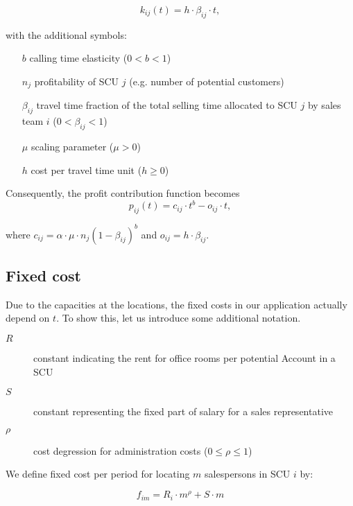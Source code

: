 \documentclass[12pt]{scrartcl}
\begin{document}
\begin{equation}
    k_{ij}(t) = h \cdot \beta_{ij} \cdot t,
\end{equation}

\noindent with the additional symbols:

\begin{itemize}
\setlength{\labelsep}{1em}
    \item[$b$] calling time elasticity ($0<b<1$)
    \item[$n_j$] profitability of SCU $j$ (e.g. number of potential customers)
    \item[$\beta_{ij}$] travel time fraction of the total selling time allocated to SCU $j$ by sales team $i$ ($0<\beta_{ij}<1$)
    \item[$\mu$] scaling parameter ($\mu > 0$)
    \item[$h$] cost per travel time unit ($h \geq 0$)
\end{itemize}

\noindent Consequently, the profit contribution function becomes
\begin{equation}
    p_{ij}(t) = c_{ij} \cdot t^b - o_{ij} \cdot t,
\end{equation}

\noindent where $c_{ij} = \alpha \cdot \mu \cdot n_j(1-\beta_{ij})^b$ and $o_{ij} = h \cdot \beta_{ij}$.

\subsection{Fixed cost}

Due to the capacities at the locations, the fixed costs in our application actually depend on $t$. To show this, let us introduce some additional notation. 

\begin{description}
\item[$R$] constant indicating the rent for office rooms per potential Account in a SCU
\item[$S$] constant representing the fixed part of salary for a sales representative
\item[$\rho$] cost degression for administration costs ($0\leq \rho \leq 1$)
\end{description}

We define fixed cost per period for locating $m$ salespersons in SCU $i$ by:

\begin{equation}
    f_{im} = R_i \cdot m ^\rho + S \cdot m \label{eq:fixcost}
\end{equation}
\end{document}
